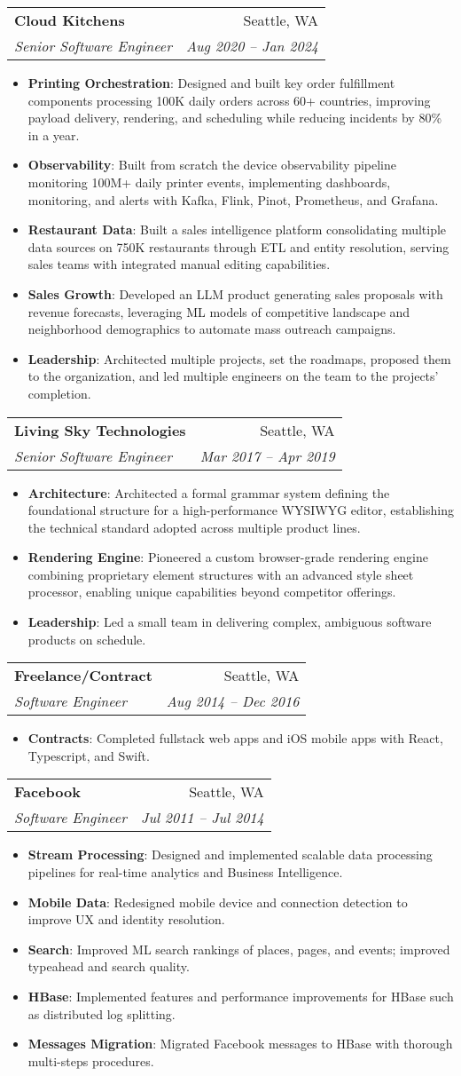 \documentclass[letterpaper,11pt]{article}
\makeatletter
\newcommand{\resumeItem}[2]{
  \item\small{
    \textbf{#1}{: #2 \vspace{-2pt}}
  }
}
\newcommand{\resumeSubheading}[4]{
  \vspace{-1pt}\item
    \begin{tabular*}{0.97\textwidth}[t]{l@{\extracolsep{\fill}}r}
      \textbf{#1} & #2 \\
      \textit{\small#3} & \textit{\small #4} \\
    \end{tabular*}\vspace{-5pt}
}
\newcommand{\resumeItemListStart}{\begin{itemize}}
\newcommand{\resumeItemListEnd}{\end{itemize}\vspace{-5pt}}
\makeatother
\begin{document}
    \resumeSubheading
      {Cloud Kitchens}{Seattle, WA}
      {Senior Software Engineer}{Aug 2020 -- Jan 2024}
      \resumeItemListStart
        \resumeItem{Printing Orchestration}
          {Designed and built key order fulfillment components processing 100K daily orders across 60+ countries, improving payload delivery, rendering, and scheduling while reducing incidents by 80\% in a year.}
        \resumeItem{Observability}
          {Built from scratch the device observability pipeline monitoring 100M+ daily printer events, implementing dashboards, monitoring, and alerts with Kafka, Flink, Pinot, Prometheus, and Grafana.}
        \resumeItem{Restaurant Data}
          {Built a sales intelligence platform consolidating multiple data sources on 750K restaurants through ETL and entity resolution, serving sales teams with integrated manual editing capabilities.}
        \resumeItem{Sales Growth}
          {Developed an LLM product generating sales proposals with revenue forecasts, leveraging ML models of competitive landscape and neighborhood demographics to automate mass outreach campaigns.}
        \resumeItem{Leadership}
          {Architected multiple projects, set the roadmaps, proposed them to the organization, and led multiple engineers on the team to the projects' completion.}
      \resumeItemListEnd

    \resumeSubheading
      {Living Sky Technologies}{Seattle, WA}
      {Senior Software Engineer}{Mar 2017 -- Apr 2019}
      \resumeItemListStart
        \resumeItem{Architecture}
          {Architected a formal grammar system defining the foundational structure for a high-performance WYSIWYG editor, establishing the technical standard adopted across multiple product lines.}
        \resumeItem{Rendering Engine}
          {Pioneered a custom browser-grade rendering engine combining proprietary element structures with an advanced style sheet processor, enabling unique capabilities beyond competitor offerings.}
        \resumeItem{Leadership}
          {Led a small team in delivering complex, ambiguous software products on schedule.}
      \resumeItemListEnd

    \resumeSubheading
      {Freelance/Contract}{Seattle, WA}
      {Software Engineer}{Aug 2014 -- Dec 2016}
      \resumeItemListStart
        \resumeItem{Contracts}
          {Completed fullstack web apps and iOS mobile apps with React, Typescript, and Swift.}
      \resumeItemListEnd

    \resumeSubheading
      {Facebook}{Seattle, WA}
      {Software Engineer}{Jul 2011 -- Jul 2014}
      \resumeItemListStart
        \resumeItem{Stream Processing}
          {Designed and implemented scalable data processing pipelines for real-time analytics and Business Intelligence.}
        \resumeItem{Mobile Data}
          {Redesigned mobile device and connection detection to improve UX and identity resolution.}
        \resumeItem{Search}
          {Improved ML search rankings of places, pages, and events; improved typeahead and search quality.}
        \resumeItem{HBase}
          {Implemented features and performance improvements for HBase such as distributed log splitting.}
        \resumeItem{Messages Migration}
          {Migrated Facebook messages to HBase with thorough multi-steps procedures.}
      \resumeItemListEnd
\end{document}
